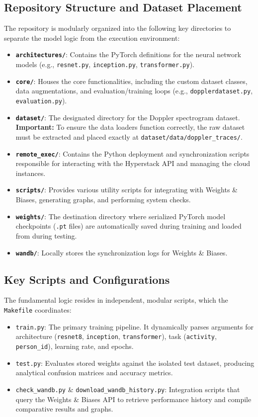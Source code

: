 \subsection{Repository Structure and Dataset Placement}
The repository is modularly organized into the following key directories to separate the model logic from the execution environment:
\begin{itemize}
    \item \textbf{\texttt{architectures/}}: Contains the PyTorch definitions for the neural network models (e.g., \texttt{resnet.py}, \texttt{inception.py}, \texttt{transformer.py}).
    \item \textbf{\texttt{core/}}: Houses the core functionalities, including the custom dataset classes, data augmentations, and evaluation/training loops (e.g., \texttt{dopplerdataset.py}, \texttt{evaluation.py}).
    \item \textbf{\texttt{dataset/}}: The designated directory for the Doppler spectrogram dataset. \textbf{Important:} To ensure the data loaders function correctly, the raw dataset must be extracted and placed exactly at \texttt{dataset/data/doppler\_traces/}.
    \item \textbf{\texttt{remote\_exec/}}: Contains the Python deployment and synchronization scripts responsible for interacting with the Hyperstack API and managing the cloud instances.
    \item \textbf{\texttt{scripts/}}: Provides various utility scripts for integrating with Weights \& Biases, generating graphs, and performing system checks.
    \item \textbf{\texttt{weights/}}: The destination directory where serialized PyTorch model checkpoints (\texttt{.pt} files) are automatically saved during training and loaded from during testing.
    \item \textbf{\texttt{wandb/}}: Locally stores the synchronization logs for Weights \& Biases.
\end{itemize}

\subsection{Key Scripts and Configurations}
The fundamental logic resides in independent, modular scripts, which the \texttt{Makefile} coordinates:
\begin{itemize}
    \item \texttt{train.py}: The primary training pipeline. It dynamically parses arguments for architecture (\texttt{resnet8}, \texttt{inception}, \texttt{transformer}), task (\texttt{activity}, \texttt{person\_id}), learning rate, and epochs.
    \item \texttt{test.py}: Evaluates stored weights against the isolated test dataset, producing analytical confusion matrices and accuracy metrics.
    \item \texttt{check\_wandb.py} \& \texttt{download\_wandb\_history.py}: Integration scripts that query the Weights \& Biases API to retrieve performance history and compile comparative results and graphs.
\end{itemize}

